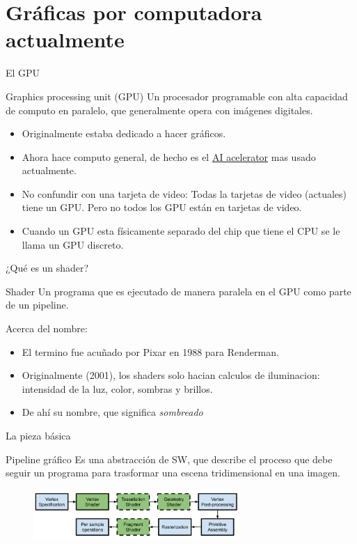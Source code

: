\section{Gráficas por computadora actualmente}

\begin{frame}{El GPU}
\begin{block}{Graphics processing unit (GPU)}
    Un procesador programable con alta capacidad de computo en paralelo, que generalmente opera con imágenes digitales.
\end{block}
    \begin{itemize}
        \item Originalmente estaba dedicado a hacer gráficos.
        \item Ahora hace computo general, de hecho es el \href{https://en.wikipedia.org/wiki/AI_accelerator}{AI acelerator} mas usado actualmente.
        \item No confundir con una tarjeta de video: Todas la tarjetas de video (actuales) tiene un GPU. Pero no todos los GPU están en tarjetas de video.
        \item Cuando un GPU esta físicamente separado del chip que tiene el CPU se le llama un GPU discreto.
     \end{itemize}
\end{frame}

\begin{frame}{¿Qué es un shader?}
\begin{block}{Shader}
    Un programa que es ejecutado de manera paralela en el GPU como parte de un pipeline.
\end{block}
Acerca del nombre:
    \begin{itemize}
        \item El termino fue acuñado por Pixar en 1988 para Renderman.
        \item Originalmente (2001), los shaders solo hacian calculos de iluminacion: intensidad de la luz, color, sombras y brillos.
        \item De ahí su nombre, que significa \emph{sombreado}
     \end{itemize}

\end{frame}

\begin{frame}{La pieza básica}
\begin{block}{Pipeline gráfico}
    Es una abstracción de SW, que describe el proceso que debe seguir un programa para trasformar una escena tridimensional en una imagen.
\end{block}
\begin{figure}[htb]
  \centering
  \includegraphics[width=0.7\textwidth]{img/RenderPipeline}
\end{figure} 
\end{frame}

